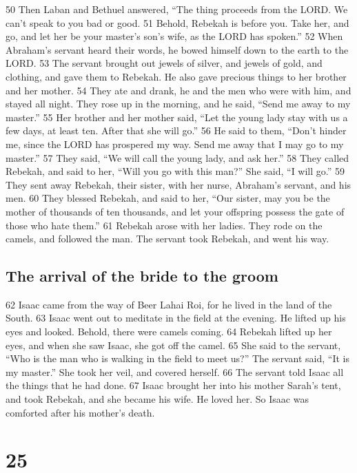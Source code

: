 {50} Then Laban and Bethuel answered, ``The thing proceeds from the
LORD. We can't speak to you bad or good. {51} Behold, Rebekah is before
you. Take her, and go, and let her be your master's son's wife, as the
LORD has spoken.'' {52} When Abraham's servant heard their words, he
bowed himself down to the earth to the LORD. {53} The servant brought
out jewels of silver, and jewels of gold, and clothing, and gave them to
Rebekah. He also gave precious things to her brother and her mother.
{54} They ate and drank, he and the men who were with him, and stayed
all night. They rose up in the morning, and he said, ``Send me away to
my master.'' {55} Her brother and her mother said, ``Let the young lady
stay with us a few days, at least ten. After that she will go.'' {56} He
said to them, ``Don't hinder me, since the LORD has prospered my way.
Send me away that I may go to my master.'' {57} They said, ``We will
call the young lady, and ask her.'' {58} They called Rebekah, and said
to her, ``Will you go with this man?'' She said, ``I will go.'' {59}
They sent away Rebekah, their sister, with her nurse, Abraham's servant,
and his men. {60} They blessed Rebekah, and said to her, ``Our sister,
may you be the mother of thousands of ten thousands, and let your
offspring possess the gate of those who hate them.'' {61} Rebekah arose
with her ladies. They rode on the camels, and followed the man. The
servant took Rebekah, and went his way.

\hypertarget{the-arrival-of-the-bride-to-the-groom}{%
\subsection{The arrival of the bride to the
groom}\label{the-arrival-of-the-bride-to-the-groom}}

{62} Isaac came from the way of Beer Lahai Roi, for he lived in the land
of the South. {63} Isaac went out to meditate in the field at the
evening. He lifted up his eyes and looked. Behold, there were camels
coming. {64} Rebekah lifted up her eyes, and when she saw Isaac, she got
off the camel. {65} She said to the servant, ``Who is the man who is
walking in the field to meet us?'' The servant said, ``It is my
master.'' She took her veil, and covered herself. {66} The servant told
Isaac all the things that he had done. {67} Isaac brought her into his
mother Sarah's tent, and took Rebekah, and she became his wife. He loved
her. So Isaac was comforted after his mother's death.

\hypertarget{section-24}{%
\section{25}\label{section-24}}

